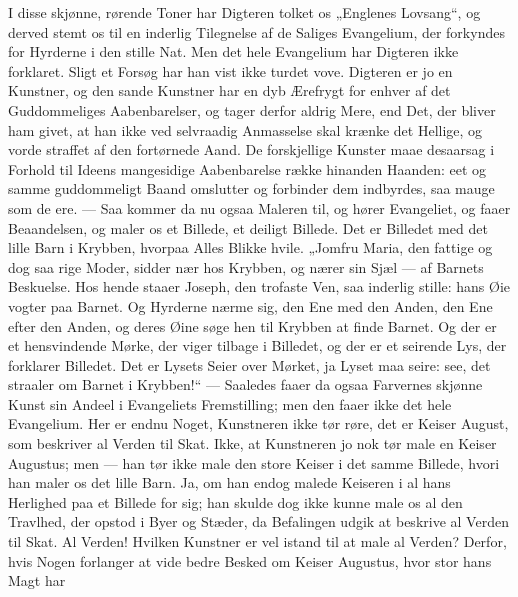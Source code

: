 \documentclass[12pt,a4paper]{book}
\begin{document}
I disse skjønne, rørende Toner har Digteren tolket os „Englenes Lovsang“, og
derved stemt os til en inderlig Tilegnelse af de Saliges Evangelium, der
forkyndes for Hyrderne i den stille Nat. Men det hele Evangelium har Digteren
ikke forklaret. Sligt et Forsøg har han vist ikke turdet vove. Digteren er jo en
Kunstner, og den sande Kunstner har en dyb Ærefrygt for enhver af det
Guddommeliges Aabenbarelser, og tager derfor aldrig Mere, end Det, der bliver ham
givet, at han ikke ved selvraadig Anmasselse skal krænke det Hellige, og vorde
straffet af den fortørnede Aand. De forskjellige Kunster maae desaarsag i Forhold
til Ideens mangesidige Aabenbarelse række hinanden Haanden: eet og samme
guddommeligt Baand omslutter og forbinder dem indbyrdes, saa mauge som de ere.
--- Saa kommer da nu ogsaa Maleren til, og hører Evangeliet, og faaer
Beaandelsen, og maler os et Billede, et deiligt Billede. Det er Billedet med det
lille Barn i Krybben, hvorpaa Alles Blikke hvile. „Jomfru Maria, den fattige og
dog saa rige Moder, sidder nær hos Krybben, og nærer sin Sjæl --- af Barnets
Beskuelse. Hos hende staaer Joseph, den trofaste Ven, saa inderlig stille: hans
Øie vogter paa Barnet. Og Hyrderne nærme sig, den Ene med den Anden, den Ene
efter den Anden, og deres Øine søge hen til Krybben at finde Barnet. Og der er et
hensvindende Mørke, der viger tilbage i Billedet, og der er et seirende Lys, der
forklarer Billedet. Det er Lysets Seier over Mørket, ja Lyset maa seire: see, det
straaler om Barnet i Krybben!“ --- Saaledes faaer da ogsaa Farvernes skjønne
Kunst sin Andeel i Evangeliets Fremstilling; men den faaer ikke det hele
Evangelium. Her er endnu Noget, Kunstneren ikke tør røre, det er Keiser August,
som beskriver al Verden til Skat. Ikke, at Kunstneren jo nok tør male en Keiser
Augustus; men --- han tør ikke male den store Keiser i det samme Billede, hvori
han maler os det lille Barn. Ja, om han endog malede Keiseren i al hans
Herlighed paa et Billede for sig; han skulde dog ikke kunne male os al den
Travlhed, der opstod i Byer og Stæder, da Befalingen udgik at beskrive al Verden
til Skat. Al Verden! Hvilken Kunstner er vel istand til at male al Verden?
Derfor, hvis Nogen forlanger at vide bedre Besked om Keiser Augustus, hvor stor
hans Magt har
\end{document}
